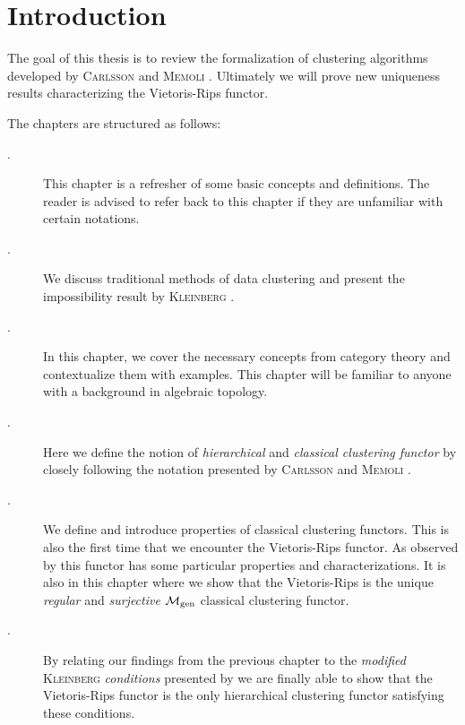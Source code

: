 \chapter*{Introduction}

The goal of this thesis is to review the formalization of clustering algorithms developed by \textsc{Carlsson} and \textsc{Memoli} \cite{Carlsson2010}. Ultimately we will prove new uniqueness results characterizing the Vietoris-Rips functor.

The chapters are structured as follows:
\begin{description}
    \item[.] This chapter is a refresher of some basic concepts and definitions. The reader is advised to refer back to this chapter if they are unfamiliar with certain notations.

    \item[.] We discuss traditional methods of data clustering and present the impossibility result by \textsc{Kleinberg} \cite{Kleinberg2002}.

    \item[.] In this chapter, we cover the necessary concepts from category theory and contextualize them with examples. This chapter will be familiar to anyone with a background in algebraic topology.

    \item[.] Here we define the notion of \emph{hierarchical} and \emph{classical clustering functor} by closely following the notation presented by \textsc{Carlsson} and \textsc{Memoli} \cite{Carlsson2010}.

    \item[.] We define and introduce properties of classical clustering functors. This is also the first time that we encounter the Vietoris-Rips functor. As observed by \cite{Carlsson2010} this functor has some particular properties and characterizations. It is also in this chapter where we show that the Vietoris-Rips is the unique \emph{regular} and \emph{surjective} ${\mathcal{M}_\mathrm{gen}}$ classical clustering functor.

    \item[.] By relating our findings from the previous chapter to the \emph{modified} \textsc{Kleinberg} \emph{conditions} presented by \cite{Carlsson2010} we are finally able to show that the Vietoris-Rips functor is the only hierarchical clustering functor satisfying these conditions.
\end{description}